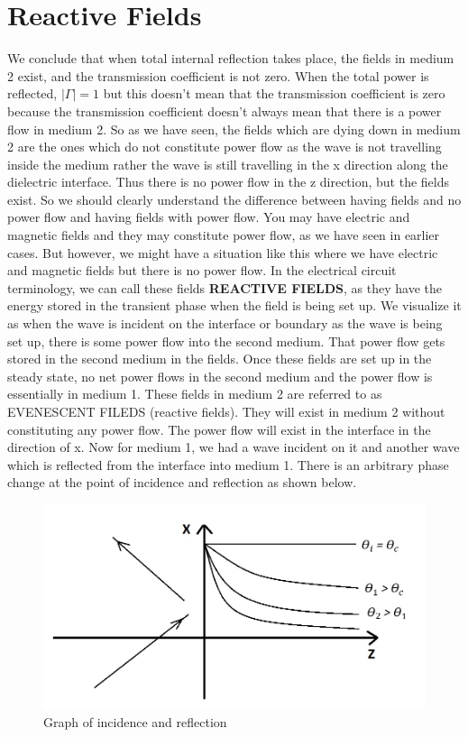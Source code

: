 \section{Reactive Fields}

We conclude that when total internal reflection takes place, the fields in medium 2 exist, and the transmission coefficient is not zero. When the total power is reflected, $|\Gamma| = 1$ but this doesn't mean that the transmission coefficient is zero because the transmission coefficient doesn't always mean that there is a power flow in medium 2. So as we have seen, the fields which are dying down in medium 2 are the ones which do not constitute power flow as the wave is not travelling inside the medium rather the wave is still travelling in the x direction along the dielectric interface. Thus there is no power flow in the z direction, but the fields exist. So we should clearly understand the difference between having fields and no power flow and having fields with power flow. You may have electric and magnetic fields and they may constitute power flow, as we have seen in earlier cases. But however, we might have a situation like this where we have electric and magnetic fields but there is no power flow. In the electrical circuit terminology, we can call these fields \textbf{ REACTIVE FIELDS}, as they have the energy stored in the transient phase when the field is being set up. We visualize it as when the wave is incident on the interface or boundary as the wave is being set up, there is some power flow into the second medium. That power flow gets stored in the second medium in the fields. Once these fields are set up in the steady state, no net power flows in the second medium and the power flow is essentially in medium 1. These fields in medium 2 are referred to as EVENESCENT FILEDS (reactive fields). They will exist in medium 2 without constituting any power flow. The power flow will exist in the interface in the direction of x. 
Now for medium 1, we had a wave incident on it and another wave which is reflected from the interface into medium 1. There is an arbitrary phase change at the point of incidence and reflection as shown below.
\begin{figure}[h]
\centering
\includegraphics[width=1\linewidth]{./graphics/amplitude_decay2}
\caption{Graph of incidence and reflection}
\end{figure}

